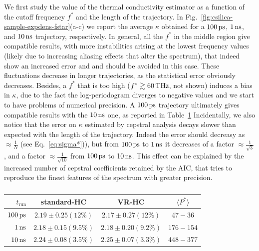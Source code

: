 We first study the value of the thermal conductivity estimator as a function of the cutoff frequency $f^*$ and the length of the trajectory. 
In Fig.~\ref{fig:csilica-sample-expdens-fstar}(a-c) we report the average $\kappa$ obtained for a $100\,\mathrm{ps}$, $1\,\mathrm{ns}$, and $10\,\mathrm{ns}$ trajectory, respectively. 
In general, all the $f^*$ in the middle region give compatible results, with more instabilities arising at the lowest frequency values (likely due to increasing aliasing effects that alter the spectrum), that indeed show an increased error and and should be avoided in this case. These fluctuations decrease in longer trajectories, as the statistical error obviously decreases. Besides, a $f^*$ that is too high ($f^*\gtrsim 60\,\mathrm{THz}$, not shown) induces a bias in $\kappa$, due to the fact the log-periodogram diverges to negative values and we start to have problems of numerical precision. 
A $100\,\mathrm{ps}$ trajectory ultimately gives compatible results with the $10\,\mathrm{ns}$ one, as reported in Table~\ref{tab:csilica-sample-kappa-cepstral}
Incidentally, we also notice that the error on $\kappa$ estimated by cepstral analysis decays slower than expected with the length of the trajectory. Indeed the error should decreasy as $\approx \frac{1}{N}$ (see Eq.~\eqref{eq:sigma*})), but from $100\,\mathrm{ps}$ to $1\,\mathrm{ns}$ it decreases of a factor $\approx \frac{1}{\sqrt{3}}$, and a factor $\approx \frac{1}{\sqrt{10}}$ from $100\,\mathrm{ps}$ to $10\,\mathrm{ns}$. This effect can be explained by the increased number of cepstral coefficients retained by the AIC, that tries to reproduce the finest features of the spectrum with greater precision. 

\begin{table}[!tb]
    \centering
    \begin{tabular}{r|cc|c}
        $t_\mathrm{run}$ & \textbf{standard-HC} & \textbf{VR-HC} & \textbf{$\langle P^* \rangle$} \\
        \hline
        $100\,\mathrm{ps}$ & $2.19 \pm 0.25 (12\%)$  & $2.17 \pm 0.27 (12\%)$ & $47-36$\\
        $1\,\mathrm{ns}$   & $2.18 \pm 0.15 (9.5\%)$ & $2.18 \pm 0.20 (9.2\%)$ & $176-154$ \\
        $10\,\mathrm{ns}$  & $2.24 \pm 0.08 (3.5\%)$ & $2.25 \pm 0.07 (3.3\%)$ & $448-377$
    \end{tabular}
    \caption{}
    \label{tab:csilica-sample-kappa-cepstral}
\end{table}


